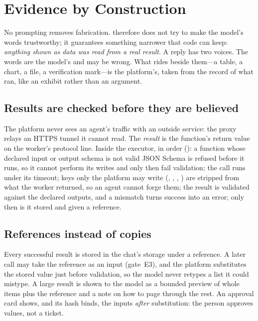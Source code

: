 \section{Evidence by Construction}
\label{sec:evidence}

No prompting removes fabrication. \sys{} therefore does not try to make
the model's words trustworthy; it guarantees something narrower that
code can keep: \emph{anything shown as data was read from a real
result}. A reply has two voices. The words are the model's and may be
wrong. What rides beside them---a table, a chart, a file, a
verification mark---is the platform's, taken from the record of what
ran, like an exhibit rather than an argument.

\subsection{Results are checked before they are believed}

The platform never sees an agent's traffic with an outside service:
the proxy relays an HTTPS  tunnel it cannot read. The
\emph{result} is the function's return value on the worker's protocol
line. Inside the executor, in order ():
a function whose declared input or output schema is not valid JSON
Schema is refused before it runs, so it cannot perform its writes and
only then fail validation; the call runs under its timeout; keys only
the platform may write (, ,
, ) are stripped from what the worker
returned, so an agent cannot forge them; the result is validated
against the declared outputs, and a mismatch turns success into an
error; only then is it stored and given a reference.

\subsection{References instead of copies}

Every successful result is stored in the chat's storage under a
reference. A later call may take the reference as an input
(gate~E3), and the platform substitutes the stored value just before
validation, so the model never retypes a list it could mistype. A large
result is shown to the model as a bounded preview of whole items plus
the reference and a note on how to page through the rest. An approval
card shows, and its hash binds, the inputs \emph{after} substitution:
the person approves values, not a ticket.

